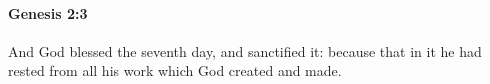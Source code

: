
		\paragraph{Genesis 2:3} %
			\label{GENESIS-2-3}

			And God blessed the seventh day, and sanctified it: because that in it he had rested from all his work which God created and made.


